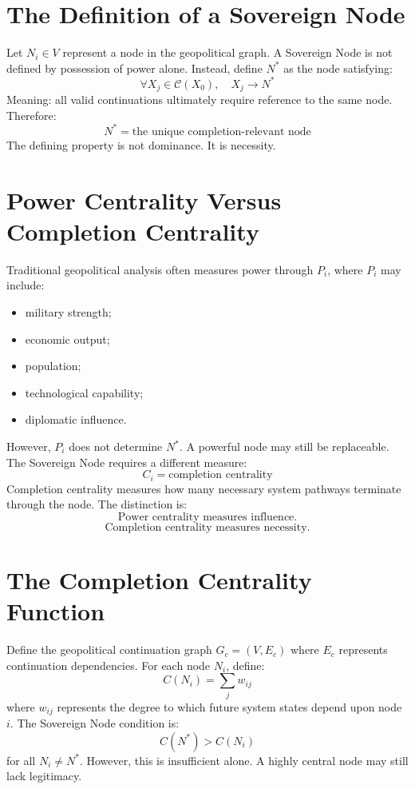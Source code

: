 \documentclass[11pt,openany]{book}
\theoremstyle{plain}
\theoremstyle{definition}
\begin{document}
\section{The Definition of a Sovereign Node}

Let \(N_i \in V\) represent a node in the geopolitical graph. A Sovereign Node is not defined by possession of power alone. Instead, define \(N^*\) as the node satisfying:
\[
\forall X_j \in \mathcal{C}(X_0), \quad X_j \to N^*
\]
Meaning: all valid continuations ultimately require reference to the same node. Therefore:
\[
\boxed{
N^* = \text{the unique completion-relevant node}
}
\]
The defining property is not dominance. It is necessity.

\section{Power Centrality Versus Completion Centrality}

Traditional geopolitical analysis often measures power through \(P_i\), where \(P_i\) may include:
\begin{itemize}
\item military strength;
\item economic output;
\item population;
\item technological capability;
\item diplomatic influence.
\end{itemize}
However, \(P_i\) does not determine \(N^*\). A powerful node may still be replaceable. The Sovereign Node requires a different measure:
\[
C_i = \text{completion centrality}
\]
Completion centrality measures how many necessary system pathways terminate through the node. The distinction is:
\[
\boxed{
\text{Power centrality measures influence.}
}
\]
\[
\boxed{
\text{Completion centrality measures necessity.}
}
\]

\section{The Completion Centrality Function}

Define the geopolitical continuation graph \(G_c = (V, E_c)\) where \(E_c\) represents continuation dependencies. For each node \(N_i\), define:
\[
C(N_i) = \sum_j w_{ij}
\]
where \(w_{ij}\) represents the degree to which future system states depend upon node \(i\). The Sovereign Node condition is:
\[
C(N^*) > C(N_i)
\]
for all \(N_i \neq N^*\). However, this is insufficient alone. A highly central node may still lack legitimacy.
\end{document}
